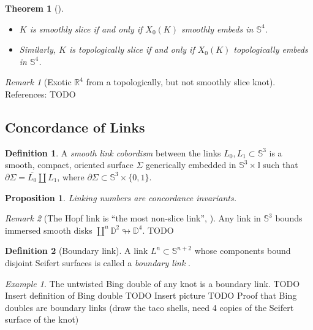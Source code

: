 \documentclass[nobib]{tufte-book} %
\newtheorem{theorem}{Theorem}
\newtheorem{proposition}{Proposition}
\theoremstyle{definition}
\newtheorem{definition}{Definition}
\theoremstyle{remark}
\newtheorem{remark}{Remark}
\newtheorem{example}{Example}
\newcommand{\sphere}[1]{\mathbb{S}^{#1}}
\newcommand{\disk}[1]{\mathbb{D}^{#1}}
\newcommand{\interval}{\mathbb{I}}
\newcommand{\R}{\mathbb{R}}
\begin{document}
\begin{theorem}[{\citep[Thm. 1.8]{miller2018knot}}]
	\begin{itemize}
		\item $K$ is smoothly slice if and only if $X_{0}(K)$ smoothly embeds in $\sphere{4}$.
		\item Similarly, $K$ is topologically slice if and only if $X_{0}(K)$ topologically
		embeds in $\sphere{4}$.
	\end{itemize}
\end{theorem}

\begin{remark}[Exotic $\R^{4}$ from a topologically, but
	not smoothly slice knot]
	References:
	\citep{57926}
	TODO
\end{remark}

\subsection{Concordance of Links}

\begin{definition}
	A \textit{smooth link cobordism}  between the links
	$L_0, L_1 \subset \sphere{3}$
	is a smooth, compact, oriented surface
	$\Sigma$ generically embedded in $\sphere{3} \times \interval$ such that
	$\partial \Sigma = \overline{L_{0}} \coprod L_{1}$,
	where $\partial \Sigma \subset \sphere{3} \times \{0, 1\}$.
\end{definition}

\begin{proposition}
	Linking numbers are concordance invariants.
\end{proposition}

\begin{remark}[The Hopf link is ``the most non-slice link'', \citep{krushkal2015slicing}]
	Any link in $\sphere{3}$ bounds immersed smooth disks
	$\coprod^{n} \disk{2} \looparrowright \disk{4}$.
	TODO
\end{remark}


\begin{definition}[Boundary link]
	A link $L^{n} \subset \sphere{n+2}$ whose components bound disjoint Seifert surfaces
	is called a \textit{boundary link} .
\end{definition}

\begin{example}
	The untwisted Bing double of any knot is a boundary link.
	TODO Insert definition of Bing double
	TODO Insert picture
	TODO Proof that Bing doubles are boundary links
	(draw the taco shells, need 4 copies of the Seifert surface
	of the knot)
\end{example}
\end{document}
